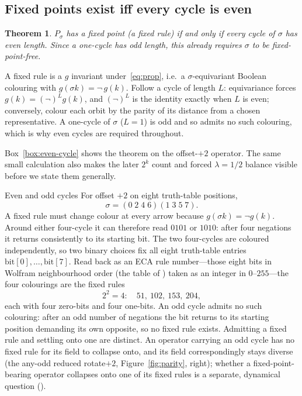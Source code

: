 \documentclass[man,12pt,floatsintext,donotrepeattitle]{apa7}
\newcommand{\sig}{\sigma}
\newcommand{\bit}[1]{\mathrm{bit}[#1]}
\newcommand{\secref}[1]{\emph{\nameref{#1}}}
\newtheorem{theorem}{Theorem}
\begin{document}
\subsection{Fixed points exist iff every cycle is even}

\begin{theorem}\label{thm:parity}
$P_\sig$ has a fixed point (a fixed rule) if and only if every cycle of
$\sig$ has even length. Since a one-cycle has odd length, this already
requires $\sig$ to be fixed-point-free.
\end{theorem}

\noindent A fixed rule is a $g$ invariant under~\eqref{eq:prop}, i.e.\ a
$\sig$-equivariant Boolean colouring with $g(\sig k) = \lnot\,g(k)$.
Follow a cycle of length $L$: equivariance forces
$g(k) = (\lnot)^{L} g(k)$, and $(\lnot)^{L}$ is the identity exactly when
$L$ is even; conversely, colour each orbit by the parity of its distance
from a chosen representative. A one-cycle of $\sig$ ($L=1$) is odd and so
admits no such colouring, which is why even cycles are required throughout.

Box~\ref{box:even-cycle} shows the theorem on the offset-$+2$ operator. The
same small calculation also makes the later $2^k$ count and forced
$\lambda=1/2$ balance visible before we state them generally.

\begin{workedexample}[label={box:even-cycle}]{Even and odd cycles}
\small
For offset $+2$ on eight truth-table positions,
\[
\sig=(0\;2\;4\;6)(1\;3\;5\;7).
\]
A fixed rule must change colour at every arrow because
$g(\sig k)=\lnot g(k)$. Around either four-cycle it can therefore read
$0101$ or $1010$: after four negations it returns consistently to its
starting bit. The two four-cycles are coloured independently, so two binary
choices fix all eight truth-table entries $\bit{0},\dots,\bit{7}$. Read back as
an ECA rule number---those eight bits in Wolfram neighbourhood order (the table
of \secref{sec:object}) taken as an integer in $0$--$255$---the four colourings
are the fixed rules
\[
2^2=4:\quad
51,\ 102,\ 153,\ 204,
\]
each with four zero-bits and four one-bits. An odd cycle admits no such
colouring: after an odd number of negations the bit returns to its starting
position demanding its own opposite, so no fixed rule exists. Admitting a fixed
rule and settling onto one are distinct. An operator carrying an odd cycle has no
fixed rule for its field to collapse onto, and its field correspondingly stays
diverse (the any-odd reduced rotate$+2$, Figure~\ref{fig:parity}, right); whether
a fixed-point-bearing operator collapses onto one of its fixed rules is a
separate, dynamical question (\secref{sec:interrupter}).
\end{workedexample}
\end{document}
